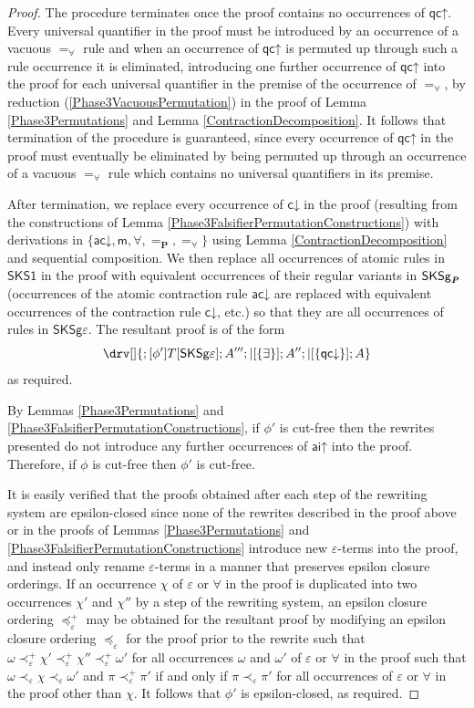 \documentclass[10pt]{article}
\theoremstyle{definition}\newtheorem{remark}[theorem]{Remark}
\theoremstyle{definition}\newtheorem{example}[theorem]{Example}
\theoremstyle{definition}\newtheorem{definition}[theorem]{Definition}
\newcommand{\SKSProp}{{\mathsf{SKSg}_{\textbf{\textit{P}}}}}
\newcommand{\SKSqDecomp}{{\mathsf{SKS1}}}
\newcommand{\FalsifierCalculus}{{\mathsf{SKSg\varepsilon}}}
\newcommand{\aiUp}{{\mathsf{ai\mathord\uparrow}}}
\newcommand{\acDown}{{\mathsf{ac\mathord\downarrow}}}
\newcommand{\cDown}{{\mathsf{c\mathord\downarrow}}}
\newcommand{\medial}{{\mathsf{m}}}
\newcommand{\qcUp}{{\mathsf{qc\mathord\uparrow}}}
\newcommand{\qcDown}{{\mathsf{qc\mathord\downarrow}}}
\newcommand{\falsifierRule}{{\mathsf{\varepsilon}}}
\newcommand{\eqProp}{=_{\textbf{P}}}
\newcommand{\eqForall}{=_{\forall}}
\begin{document}
\begin{proof}
		The procedure terminates once the proof contains no occurrences of $\qcUp$. Every universal quantifier in the proof must be introduced by an occurrence of a vacuous $\eqForall$ rule and when an occurrence of $\qcUp$ is permuted up through such a rule occurrence it is eliminated, introducing one further occurrence of $\qcUp$ into the proof for each universal quantifier in the premise of the occurrence of $\eqForall$, by reduction (\ref{Phase3VacuousPermutation}) in the proof of Lemma \ref{Phase3Permutations} and Lemma \ref{ContractionDecomposition}. It follows that termination of the procedure is guaranteed, since every occurrence of $\qcUp$ in the proof must eventually be eliminated by being permuted up through an occurrence of a vacuous $\eqForall$ rule which contains no universal quantifiers in its premise.
		
		After termination, we replace every occurrence of $\cDown$ in the proof (resulting from the constructions of Lemma \ref{Phase3FalsifierPermutationConstructions}) with derivations in $\{\acDown, \medial, \forall, \eqProp, \eqForall\}$ using Lemma \ref{ContractionDecomposition} and sequential composition. We then replace all occurrences of atomic rules in $\SKSqDecomp$ in the proof with equivalent occurrences of their regular variants in $\SKSProp$ (occurrences of the atomic contraction rule $\acDown$ are replaced with equivalent occurrences of the contraction rule $\cDown$, etc.) so that they are all occurrences of rules in $\FalsifierCalculus$. The resultant proof is of the form
		\[
		\drv[] {
			; [\phi']T[\FalsifierCalculus] ; A''' ; |[\{\exists\}] ; A'' ; |[\{\qcDown\}] ; A
		}
		\]
		as required.
		
		By Lemmas \ref{Phase3Permutations} and \ref{Phase3FalsifierPermutationConstructions}, if $\phi'$ is cut-free then the rewrites presented do not introduce any further occurrences of $\aiUp$ into the proof. Therefore, if $\phi$ is cut-free then $\phi'$ is cut-free.
		
		It is easily verified that the proofs obtained after each step of the rewriting system are epsilon-closed since none of the rewrites described in the proof above or in the proofs of Lemmas \ref{Phase3Permutations} and \ref{Phase3FalsifierPermutationConstructions} introduce new $\varepsilon$-terms into the proof, and instead only rename $\varepsilon$-terms in a manner that preserves epsilon closure orderings. If an occurrence $\chi$ of $\falsifierRule$ or $\forall$ in the proof is duplicated into two occurrences $\chi'$ and $\chi''$ by a step of the rewriting system, an epsilon closure ordering $\preccurlyeq_\varepsilon^+$ may be obtained for the resultant proof by modifying an epsilon closure ordering $\preccurlyeq_\varepsilon$ for the proof prior to the rewrite such that $\omega \prec_\varepsilon^+ \chi' \prec_\varepsilon^+ \chi'' \prec_\varepsilon^+ \omega'$ for all occurrences $\omega$ and $\omega'$ of $\falsifierRule$ or $\forall$ in the proof such that $\omega \prec_\varepsilon \chi \prec_\varepsilon \omega'$ and $\pi \prec_\varepsilon^+ \pi'$ if and only if $\pi \prec_\varepsilon \pi'$ for all occurrences of $\falsifierRule$ or $\forall$ in the proof other than $\chi$. It follows that $\phi'$ is epsilon-closed, as required.
		

\end{proof}
\end{document}
